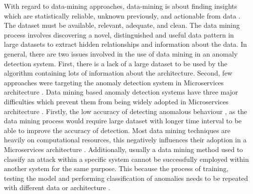 With regard to data-mining approaches, data-mining is about finding insights which are statistically reliable, unknown previously, and actionable from data \cite{phua2010comprehensive}. The dataset must be available, relevant, adequate, and clean. The data mining process involves discovering a novel, distinguished and useful data pattern in large datasets to extract hidden relationships and information about the data. In general, there are two issues involved in the use of data mining in an anomaly detection system. First, there is a lack of a large dataset to be used by the algorithm containing lots of information about the architecture. Second, few approaches were targeting the anomaly detection system in Microservices architecture \cite{phua2010comprehensive}. Data mining based anomaly detection systems have three major difficulties which prevent them from being widely adopted in Microservices architecture \cite{Patcha:2007hja}. Firstly, the low accuracy of detecting anomalous behaviour \cite{gupta2016network,Patcha:2007hja}, as the data mining process would require large dataset with longer time interval to be able to improve the accuracy of detection. Most data mining techniques are heavily on computational resources, this negatively influences their adoption in a Microservices architecture \cite{Patcha:2007hja}. Additionally, usually a data mining method used to classify an attack within a specific system cannot be successfully employed within another system for the same purpose. This because the process of training, testing the model and performing classification of anomalies needs to be repeated with different data or architecture \cite{Buczak:2016kt}.  

